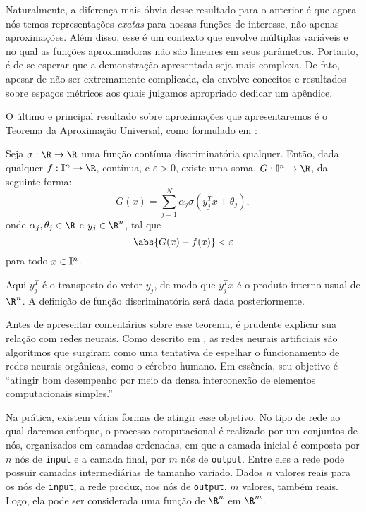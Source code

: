Naturalmente, a diferença mais óbvia desse resultado para o anterior é que agora nós temos representações \emph{exatas} para nossas funções de interesse, não apenas aproximações.
Além disso, esse é um contexto que envolve múltiplas variáveis e no qual as funções aproximadoras não são lineares em seus parâmetros.
Portanto, é de se esperar que a demonstração apresentada seja mais complexa.
De fato, apesar de não ser extremamente complicada, ela envolve conceitos e resultados sobre espaços métricos aos quais julgamos apropriado dedicar um apêndice.

O último e principal resultado sobre aproximações que apresentaremos é o Teorema da Aproximação Universal, como formulado em \cite{cybenko89}:
\begin{TAU}
    Seja \( \sigma : \R \to \R \) uma função contínua discriminatória qualquer.
    Então, dada qualquer \( f : \I^{ n } \to \R \), contínua, e \( \varepsilon > 0 \), existe uma soma, \( G : \I^{ n } \to \R \), da seguinte forma:
    \begin{equation}
        G(x) = \sum_{ j=1 }^{ N } \alpha_{ j } \sigma(y_{ j }^{ T }x + \theta_{ j })
        \label{eq: neural_func_form}
    ,\end{equation}
    onde \( \alpha_{ j }, \theta_{ j } \in \R \) e \( y_{ j } \in \R^{ n } \), tal que \[
        \abs{ G(x) - f(x) } < \varepsilon
    \]
    para todo \( x \in \mathbb{I}^{ n } \).
\end{TAU}

Aqui \( y_{ j }^{ T } \) é o transposto do vetor \( y_{ j } \), de modo que \( y_{ j }^{ T }x \) é o produto interno usual de \( \R^{ n } \).
A definição de função discriminatória será dada posteriormente.

Antes de apresentar comentários sobre esse teorema, é prudente explicar sua relação com redes neurais.
Como descrito em \cite{lipmann}, as redes neurais artificiais são algoritmos que surgiram como uma tentativa de espelhar o funcionamento de redes neurais orgânicas, como o cérebro humano.
Em essência, seu objetivo é ``atingir bom desempenho por meio da densa interconexão de elementos computacionais simples.''

Na prática, existem várias formas de atingir esse objetivo.
No tipo de rede ao qual daremos enfoque, o processo computacional é realizado por um conjuntos de nós, organizados em camadas ordenadas, em que a camada inicial é composta por \( n \) nós de \verb|input| e a camada final, por \( m \) nós de \verb|output|.
Entre eles a rede pode possuir camadas intermediárias de tamanho variado.
Dados \( n \) valores reais para os nós de \verb|input|, a rede produz, nos nós de \verb|output|, \( m \) valores, também reais.
Logo, ela pode ser considerada uma função de \( \R^{ n } \) em \( \R^{ m } \).

